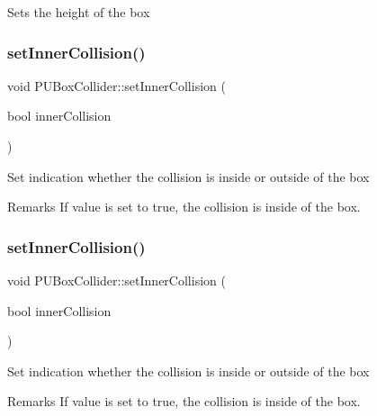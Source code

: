 Sets the height of the box \mbox{\label{classPUBoxCollider_aa33fc7d0f8f816c3aed9e44355387026}} 
\subsubsection{\texorpdfstring{set\+Inner\+Collision()}{setInnerCollision()}\hspace{0.1cm}{\footnotesize\ttfamily [1/2]}}
{\footnotesize\ttfamily void P\+U\+Box\+Collider\+::set\+Inner\+Collision (\begin{DoxyParamCaption}\item[{bool}]{inner\+Collision }\end{DoxyParamCaption})}

Set indication whether the collision is inside or outside of the box \begin{DoxyRemark}{Remarks}
If value is set to true, the collision is inside of the box. 
\end{DoxyRemark}
\mbox{\label{classPUBoxCollider_aa33fc7d0f8f816c3aed9e44355387026}} 
\subsubsection{\texorpdfstring{set\+Inner\+Collision()}{setInnerCollision()}\hspace{0.1cm}{\footnotesize\ttfamily [2/2]}}
{\footnotesize\ttfamily void P\+U\+Box\+Collider\+::set\+Inner\+Collision (\begin{DoxyParamCaption}\item[{bool}]{inner\+Collision }\end{DoxyParamCaption})}

Set indication whether the collision is inside or outside of the box \begin{DoxyRemark}{Remarks}
If value is set to true, the collision is inside of the box. 
\end{DoxyRemark}
\mbox{\label{classPUBoxCollider_aad771def3e9af572efaa8133fb2ab070}} 
